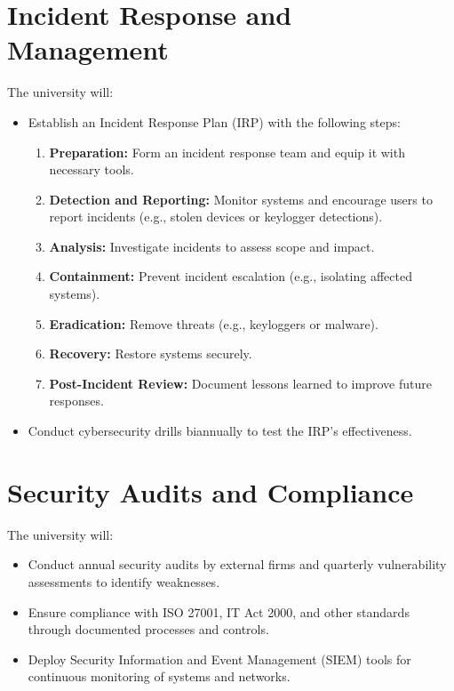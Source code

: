 \documentclass[11pt]{article}
\begin{document}
\section{Incident Response and Management}
The university will:
\begin{itemize}
    \item Establish an Incident Response Plan (IRP) with the following steps:
    \begin{enumerate}
        \item \textbf{Preparation:} Form an incident response team and equip it with necessary tools.
        \item \textbf{Detection and Reporting:} Monitor systems and encourage users to report incidents (e.g., stolen devices or keylogger detections).
        \item \textbf{Analysis:} Investigate incidents to assess scope and impact.
        \item \textbf{Containment:} Prevent incident escalation (e.g., isolating affected systems).
        \item \textbf{Eradication:} Remove threats (e.g., keyloggers or malware).
        \item \textbf{Recovery:} Restore systems securely.
        \item \textbf{Post-Incident Review:} Document lessons learned to improve future responses.
    \end{enumerate}
    \item Conduct cybersecurity drills biannually to test the IRP’s effectiveness.
\end{itemize}

\section{Security Audits and Compliance}
The university will:
\begin{itemize}
    \item Conduct annual security audits by external firms and quarterly vulnerability assessments to identify weaknesses.
    \item Ensure compliance with ISO 27001, IT Act 2000, and other standards through documented processes and controls.
    \item Deploy Security Information and Event Management (SIEM) tools for continuous monitoring of systems and networks.
\end{itemize}
\end{document}
